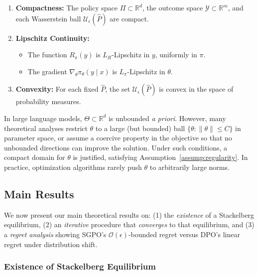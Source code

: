 \begin{assumption}
\label{assump:regularity}
\begin{enumerate}
\item \textbf{Compactness:} The policy space \(\Pi\subset\mathbb{R}^d\), the outcome space \(\mathcal{Y}\subset\mathbb{R}^m\), and each Wasserstein ball \(\mathcal{U}_\epsilon(\hat{P})\) are compact.  
\item \textbf{Lipschitz Continuity:}  
\begin{itemize}
\item The function \(R_\pi(y)\) is \(L_R\)-Lipschitz in \(y\), uniformly in \(\pi\).  
\item The gradient \(\nabla_\theta \pi_\theta(y \mid x)\) is \(L_\pi\)-Lipschitz in \(\theta\). 
\end{itemize}
\item \textbf{Convexity:} For each fixed \(\hat{P}\), the set \(\mathcal{U}_\epsilon(\hat{P})\) is convex in the space of probability measures.
\end{enumerate}
\end{assumption}

\begin{remark}
In large language models, \(\Theta\subset\mathbb{R}^d\) is unbounded \emph{a priori}.  However, many theoretical analyses restrict \(\theta\) to a large (but bounded) ball \(\{\theta:\|\theta\|\le C\}\) in parameter space, or assume a coercive property in the objective so that no unbounded directions can improve the solution.  Under such conditions, a compact domain for \(\theta\) is justified, satisfying Assumption~\ref{assump:regularity}.  
In practice, optimization algorithms rarely push \(\theta\) to arbitrarily large norms.
\end{remark}


\subsection{Main Results}

We now present our main theoretical results on: (1) the \emph{existence} of a Stackelberg equilibrium, (2) an \emph{iterative} procedure that \emph{converges} to that equilibrium, and (3) a \emph{regret analysis} showing SGPO’s \(\mathcal{O}(\epsilon)\)-bounded regret versus DPO’s linear regret under distribution shift.

\subsubsection{Existence of Stackelberg Equilibrium}


